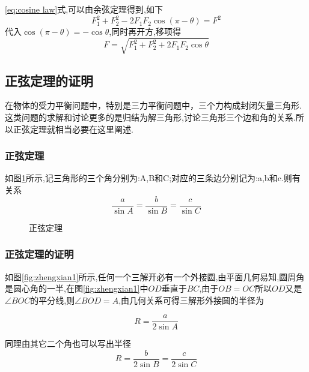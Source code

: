 \eqref{eq:cosine law}式,可以由余弦定理得到,如下
$$F_1^2+F_2^2-2F_1F_2\cos(\pi-\theta)=F^2$$
代入$\cos(\pi-\theta)=-\cos\theta$,同时再开方,移项得
$$F=\sqrt{F_1^2+F_2^2+2F_1F_2\cos\theta}$$


\subsection{正弦定理的证明}

在物体的受力平衡问题中，特别是三力平衡问题中，三个力构成封闭矢量三角形.这类问题的求解和讨论更多的是归结为解三角形,讨论三角形三个边和角的关系.所以正弦定理就相当必要在这里阐述.

\subsubsection{正弦定理}
如图\ref{fig:zhengxian}所示,记三角形的三个角分别为:A,B和C;对应的三条边分别记为:a,b和c.则有关系
\begin{equation}
  \frac{a}{\sin A}=\frac{b}{\sin B}=\frac{c}{\sin C}
  \label{eq:zhengxian}
\end{equation}

\begin{figure}[H]
  \centering
  \caption{正弦定理}
  \label{fig:zhengxian}
\end{figure}

\subsubsection{正弦定理的证明}

如图\ref{fig:zhengxian1}所示,任何一个三解开必有一个外接圆,由平面几何易知,圆周角是圆心角的一半,在图\ref{fig:zhengxian1}中$OD$垂直于$BC$,由于$OB=OC$所以$OD$又是$\angle BOC$的平分线,则$\angle BOD=A$,由几何关系可得三解形外接圆的半径为

\[
  R=\frac{a}{2\sin A}
\]

同理由其它二个角也可以写出半径
\[
  R=\frac{b}{2\sin B}=\frac{c}{2\sin C}
\]

